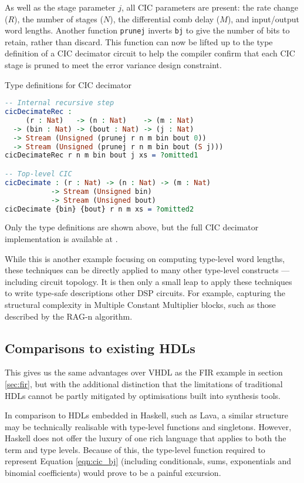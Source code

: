 \documentclass[conference]{IEEEtran}
\begin{document}
As well as the stage parameter $j$, all CIC parameters are present: the rate
change ($R$), the number of stages ($N$), the differential comb delay ($M$), and
input/output word lengths. Another function \texttt{prunej} inverts
\texttt{bj} to give the number of bits to retain, rather than discard. This
function can now be lifted up to the type definition of a CIC decimator circuit
to help the compiler confirm that each CIC stage is pruned to meet the error
variance design constraint.

\begin{codefig}[h]
  \caption{Type definitions for CIC decimator}
\begin{lstlisting}[language=idris]
-- Internal recursive step
cicDecimateRec :
     (r : Nat)   -> (n : Nat)    -> (m : Nat)
  -> (bin : Nat) -> (bout : Nat) -> (j : Nat)
  -> Stream (Unsigned (prunej r n m bin bout 0))
  -> Stream (Unsigned (prunej r n m bin bout (S j)))
cicDecimateRec r n m bin bout j xs = ?omitted1

-- Top-level CIC
cicDecimate : (r : Nat) -> (n : Nat) -> (m : Nat)
           -> Stream (Unsigned bin)
           -> Stream (Unsigned bout)
cicDecimate {bin} {bout} r n m xs = ?omitted2
\end{lstlisting}
\label{lst:cic_types}
\end{codefig}

Only the type definitions are shown above, but the full CIC decimator
implementation is available at \cite{ramsay_20_gh}.

While this is another example focusing on computing type-level word lengths,
these techniques can be directly applied to many other type-level constructs ---
including circuit topology. It is then only a small leap to apply these
techniques to write type-safe descriptions other DSP circuits. For example,
capturing the structural complexity in Multiple Constant Multiplier blocks, such
as those described by the RAG-n algorithm\cite{dempster_95}.

\subsection{Comparisons to existing HDLs}

This gives us the same advantages over VHDL as the FIR example in section
\ref{sec:fir}, but with the additional distinction that the limitations of
traditional HDLs cannot be partly mitigated by optimisations built into
synthesis tools.

In comparison to HDLs embedded in Haskell, such as Lava, a similar structure may
be technically realisable with type-level functions and singletons. However,
Haskell does not offer the luxury of one rich language that applies to both the
term and type levels. Because of this, the type-level function required to
represent Equation \ref{eqn:cic_bj} (including conditionals, sums, exponentials
and binomial coefficients) would prove to be a painful excursion.
\end{document}
